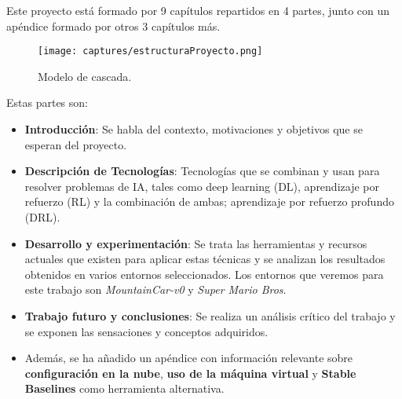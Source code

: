 \documentclass[11pt,fleqn]{book} %
\begin{document}
Este proyecto está formado por 9 capítulos repartidos en 4 partes, junto con un apéndice formado por otros 3 capítulos más.

\begin{figure}[H]
	\centering\texttt{[image: captures/estructuraProyecto.png]}
	\caption{Modelo de cascada.}
	\label{fig:estructuraProyecto} %
\end{figure}

Estas partes son: \\

\begin{itemize}
	\item \textbf{Introducción}: Se habla del contexto, motivaciones y objetivos que se esperan del proyecto. \\
	
	\item \textbf{Descripción de Tecnologías}: Tecnologías que se combinan y usan para resolver problemas de IA, tales como deep learning (DL), aprendizaje por refuerzo (RL) y la combinación de ambas; aprendizaje por refuerzo profundo (DRL).\\
	
	\item \textbf{Desarrollo y experimentación}: Se trata las herramientas y recursos actuales que existen para aplicar estas técnicas y se analizan los resultados obtenidos en varios entornos seleccionados. Los entornos que veremos para este trabajo son \textit{MountainCar-v0} y \textit{Super Mario Bros}.\\
	
	
	\item \textbf{Trabajo futuro y conclusiones}: Se realiza un análisis crítico del trabajo y se exponen las sensaciones y conceptos adquiridos. \\
	
	\item Además, se ha añadido un apéndice con información relevante sobre \textbf{configuración en la nube}, \textbf{uso de la máquina virtual} y \textbf{Stable Baselines} como herramienta alternativa. \\
\end{itemize}
\end{document}
